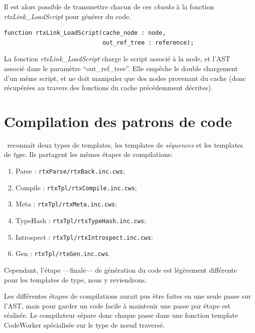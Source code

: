\documentclass[french]{rtxreport}
\begin{document}
Il est alors possible de transmettre chacun de ces \emph{chunks} à la fonction
\emph{rtxLink\_LoadScript} pour générer du code.


\begin{lstlisting}
function rtxLink_LoadScript(cache_node : node,
                            out_ref_tree : reference);
\end{lstlisting}
La fonction \emph{rtxLink\_LoadScript} charge le script associé à la node, et
l'AST associé dans le paramètre ``out\_ref\_tree''. Elle empêche le
double chargement d'un même script, et ne doit manipuler que des nodes
provenant du cache (donc récupérées au travers des fonctions du cache
précédemment décrites).





\section{Compilation des patrons de code}

\rtx\ reconnait deux types de templates, les templates de \emph{séquences} et
les templates de \emph{type}. Ils partagent les mêmes étapes de compilations:
\begin{enumerate}
    \item Parse : \texttt{rtxParse/rtxBack.inc.cws};
    \item Compile : \texttt{rtxTpl/rtxCompile.inc.cws};
    \item Meta : \texttt{rtxTpl/rtxMeta.inc.cws};
    \item TypeHash : \texttt{rtxTpl/rtxTypeHash.inc.cws};
    \item Introspect : \texttt{rtxTpl/rtxIntrospect.inc.cws};
    \item Gen : \texttt{rtxTpl/rtxGen.inc.cws}.
\end{enumerate}
Cependant, l'étape ---finale--- de génération du code est légèrement différente
pour les templates de type, nous y reviendrons.

Les différentes étapes de compilations aurait pus être faites en une seule passe
sur l'AST, mais pour garder un code facile à maintenir une passe par étape est
réalisée. Le compilateur sépare donc chaque passe dans une fonction template
CodeWorker spécialisée sur le type de nœud traversé. %
\end{document}
